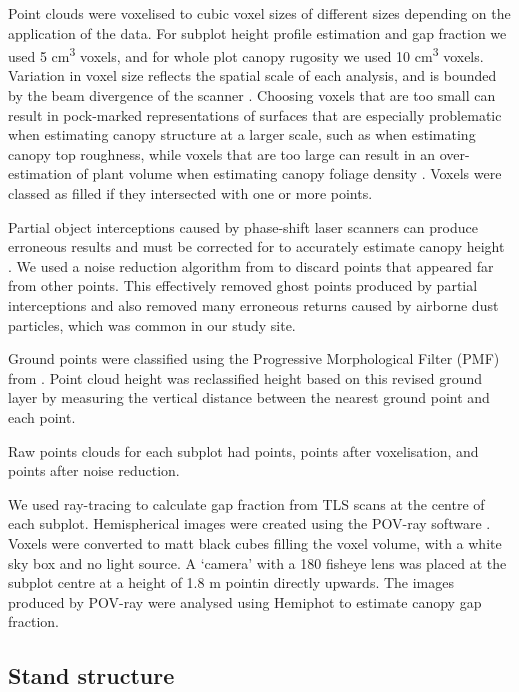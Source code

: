 \documentclass[11pt,a4paper]{article}
\newcommand{\textapprox}{\raisebox{0.5ex}{\texttildelow}}  %
\begin{document}
Point clouds were voxelised to cubic voxel sizes of different sizes depending on the application of the data. For subplot height profile estimation and gap fraction we used 5 cm\textsuperscript{3} voxels, and for whole plot canopy rugosity we used 10 cm\textsuperscript{3} voxels. Variation in voxel size reflects the spatial scale of each analysis, and is bounded by the beam divergence of the scanner \citep{}. Choosing voxels that are too small can result in pock-marked representations of surfaces that are especially problematic when estimating canopy structure at a larger scale, such as when estimating canopy top roughness, while voxels that are too large can result in an over-estimation of plant volume when estimating canopy foliage density \citep{Cifuentes2014}. Voxels were classed as filled if they intersected with one or more points.

Partial object interceptions caused by phase-shift laser scanners can produce erroneous results and must be corrected for to accurately estimate canopy height \citep{}. We used a noise reduction algorithm from \citet{} to discard points that appeared far from other points. This effectively removed ghost points produced by partial interceptions and also removed many erroneous returns caused by airborne dust particles, which was common in our study site.

Ground points were classified using the Progressive Morphological Filter (PMF) from \citet{Zhang2003}. Point cloud height was reclassified height based on this revised ground layer by measuring the vertical distance between the nearest ground point and each point.

Raw points clouds for each subplot had \textapprox{}\rawpt{} points, \textapprox{}\voxelpt{} points after voxelisation, and \textapprox{}\subpt{} points after noise reduction.

We used ray-tracing to calculate gap fraction from TLS scans at the centre of each subplot. Hemispherical images were created using the POV-ray software \citep{}. Voxels were converted to matt black cubes filling the voxel volume, with a white sky box and no light source. A `camera' with a 180\textdegree{} fisheye lens was placed at the subplot centre at a height of 1.8 m pointin directly upwards. The images produced by POV-ray were analysed using Hemiphot \citep{Steege} to estimate canopy gap fraction.

\subsection{Stand structure}
\end{document}
